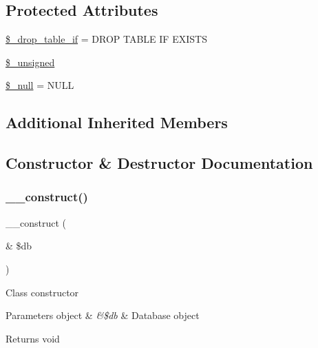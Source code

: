 \subsection*{Protected Attributes}
\begin{DoxyCompactItemize}
\item 
\mbox{\hyperlink{class_c_i___d_b__pdo__pgsql__forge_a92a8a9145a7fc91e252e58d019373581}{\$\+\_\+drop\+\_\+table\+\_\+if}} = \textquotesingle{}D\+R\+OP T\+A\+B\+LE IF E\+X\+I\+S\+TS\textquotesingle{}
\item 
\mbox{\hyperlink{class_c_i___d_b__pdo__pgsql__forge_aae977ae6d61fa183f0b25422b6ddc31c}{\$\+\_\+unsigned}}
\item 
\mbox{\hyperlink{class_c_i___d_b__pdo__pgsql__forge_ae58fe6a5104d4a069a49b27533ce808f}{\$\+\_\+null}} = \textquotesingle{}N\+U\+LL\textquotesingle{}
\end{DoxyCompactItemize}
\subsection*{Additional Inherited Members}


\subsection{Constructor \& Destructor Documentation}
\mbox{\label{class_c_i___d_b__pdo__pgsql__forge_aaf2ef772755ec6f361d44e16cc9ffd69}} 
\subsubsection{\texorpdfstring{\+\_\+\+\_\+construct()}{\_\_construct()}}
{\footnotesize\ttfamily \+\_\+\+\_\+construct (\begin{DoxyParamCaption}\item[{\&}]{\$db }\end{DoxyParamCaption})}

Class constructor


\begin{DoxyParams}[1]{Parameters}
object & {\em \&\$db} & Database object \\
\hline
\end{DoxyParams}
\begin{DoxyReturn}{Returns}
void 
\end{DoxyReturn}


